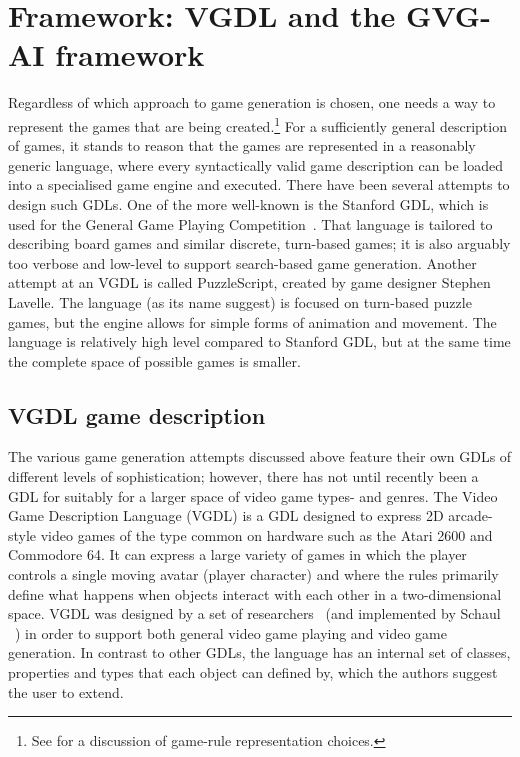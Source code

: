 \documentclass[a4paper,titlepage,final]{report}
\begin{document}
\section{Framework: VGDL and the GVG-AI framework}
\label{sec_gvgaiframework}
Regardless of which approach to game generation is chosen, one needs a way to represent the games that are being created.\footnote{See \citet{pcgbook:ch6} for a discussion of game-rule representation choices.} For a sufficiently general description of games, it stands to reason that the games are represented in a reasonably generic language, where every syntactically valid game description can be loaded into a specialised game engine and executed. 
There have been several attempts to design such GDLs. One of the more well-known is the Stanford GDL, which is used for the General Game Playing Competition~\citet{genesereth2005general}. That language is tailored to describing board games and similar discrete, turn-based games; it is also arguably too verbose and low-level to support search-based game generation. 
Another attempt at an VGDL is called PuzzleScript, created by game designer Stephen Lavelle. The language (as its name suggest) is focused on turn-based puzzle games, but the engine allows for simple forms of animation and movement. The language is relatively high level compared to Stanford GDL, but at the same time the complete space of possible games is smaller.


\subsection{VGDL game description}
\label{ssec_vgdl}
The various game generation attempts discussed above feature their own GDLs of different levels of sophistication; however, there has not until recently been a GDL for suitably for a larger space of video game types- and genres.
The Video Game Description Language (VGDL) is a GDL designed to express 2D arcade-style video games of the type common on hardware such as the Atari 2600 and Commodore 64. It can express a large variety of games in which the player controls a single moving avatar (player character) and where the rules primarily define what happens when objects interact with each other in a two-dimensional space. VGDL was designed by a set of researchers~\citet{levine2013general,ebner2013towards} (and implemented by Schaul ~\citet{schaul2013video}) in order to support both general video game playing and video game generation.
In contrast to other GDLs, the language has an internal set of classes, properties and types that each object can defined by, which the authors suggest the user to extend.
\end{document}
